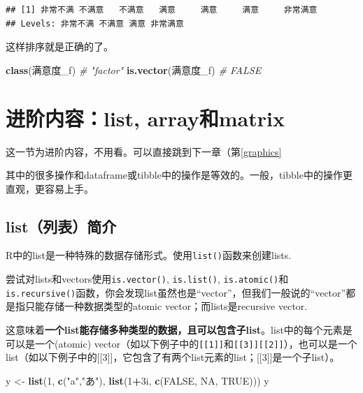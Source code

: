 \documentclass[]{book}
\newenvironment{Shaded}{\begin{snugshade}}{\end{snugshade}}
\newcommand{\CommentTok}[1]{\textcolor[rgb]{0.56,0.35,0.01}{\textit{#1}}}
\newcommand{\DecValTok}[1]{\textcolor[rgb]{0.00,0.00,0.81}{#1}}
\newcommand{\KeywordTok}[1]{\textcolor[rgb]{0.13,0.29,0.53}{\textbf{#1}}}
\newcommand{\NormalTok}[1]{#1}
\newcommand{\OperatorTok}[1]{\textcolor[rgb]{0.81,0.36,0.00}{\textbf{#1}}}
\newcommand{\OtherTok}[1]{\textcolor[rgb]{0.56,0.35,0.01}{#1}}
\newcommand{\StringTok}[1]{\textcolor[rgb]{0.31,0.60,0.02}{#1}}
\begin{document}
\begin{verbatim}
## [1] 非常不满 不满意   不满意   满意     满意     满意     非常满意
## Levels: 非常不满 不满意 满意 非常满意
\end{verbatim}

这样排序就是正确的了。

\begin{Shaded}
\begin{Highlighting}[]
\KeywordTok{class}\NormalTok{(满意度_f) }\CommentTok{# "factor"}
\KeywordTok{is.vector}\NormalTok{(满意度_f) }\CommentTok{# FALSE}
\end{Highlighting}
\end{Shaded}

\hypertarget{list-arraymatrix}{%
\section{进阶内容：list, array和matrix}\label{list-arraymatrix}}

这一节为进阶内容，不用看。可以直接跳到下一章（第\ref{graphics}

其中的很多操作和dataframe或tibble中的操作是等效的。一般，tibble中的操作更直观，更容易上手。

\hypertarget{list}{%
\subsection{list（列表）简介}\label{list}}

R中的list是一种特殊的数据存储形式。使用\texttt{list()}函数来创建lists.

尝试对lists和vectors使用\texttt{is.vector()}, \texttt{is.list()}, \texttt{is.atomic()}和\texttt{is.recursive()}函数，你会发现list虽然也是``vector''，但我们一般说的``vector''都是指只能存储一种数据类型的atomic vector；而lists是recursive vector.

这意味着\textbf{一个list能存储多种类型的数据，且可以包含子list}。list中的每个元素是可以是一个(atomic) vector（如以下例子中的\texttt{{[}{[}1{]}{]}}和\texttt{{[}{[}3{]}{]}{[}{[}2{]}{]}}），也可以是一个list（如以下例子中的{[}{[}3{]}{]}，它包含了有两个list元素的list；{[}{[}3{]}{]}是一个子list）。

\begin{Shaded}
\begin{Highlighting}[]
\NormalTok{y <-}\StringTok{ }\KeywordTok{list}\NormalTok{(}\DecValTok{1}\NormalTok{, }\KeywordTok{c}\NormalTok{(}\StringTok{"a"}\NormalTok{,}\StringTok{"あ"}\NormalTok{), }\KeywordTok{list}\NormalTok{(}\DecValTok{1}\OperatorTok{+}\NormalTok{3i, }\KeywordTok{c}\NormalTok{(}\OtherTok{FALSE}\NormalTok{, }\OtherTok{NA}\NormalTok{, }\OtherTok{TRUE}\NormalTok{)))}
\NormalTok{y}
\end{Highlighting}
\end{Shaded}
\end{document}
